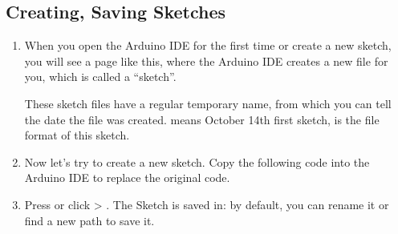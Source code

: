 \documentclass[a4paper,11pt,english]{sphinxmanual}
\begin{document}
\subsection{Creating, Saving Sketches}
\label{\detokenize{Get_Started_with_Arduino/Creating_Opening_Saving_Sketches:creating-saving-sketches}}\begin{enumerate}
%
\item {} 
\sphinxAtStartPar
When you open the Arduino IDE for the first time or create a new sketch, you will see a page like this, where the Arduino IDE creates a new file for you, which is called a “sketch”.

\noindent{}

\sphinxAtStartPar
These sketch files have a regular temporary name, from which you can tell the date the file was created.  means October 14th first sketch,  is the file format of this sketch.

\item {} 
\sphinxAtStartPar
Now let’s try to create a new sketch. Copy the following code into the Arduino IDE to replace the original code.

\noindent{}

\begin{sphinxVerbatim}[commandchars=\\\{\}]

\end{sphinxVerbatim}

\item {} 
\sphinxAtStartPar
Press  or click  \sphinxhyphen{}\textgreater{} . The Sketch is saved in:  by default, you can rename it or find a new path to save it.


\end{enumerate}
\end{document}
